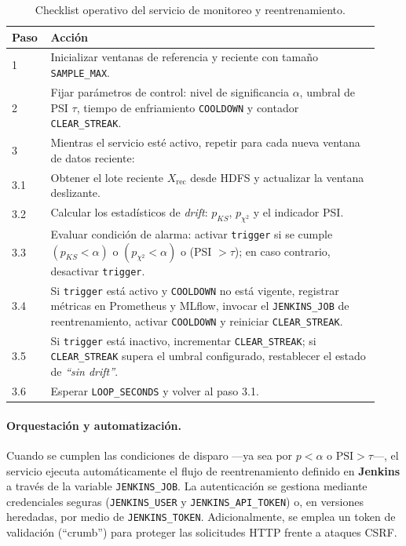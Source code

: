 \begin{table}[htbp]
\centering
\caption{Checklist operativo del servicio de monitoreo y reentrenamiento.}
\label{tab:checklist-driftwatch}
\small
\begin{tabular}{p{0.09\linewidth} p{0.84\linewidth}}
\toprule
\textbf{Paso} & \textbf{Acción} \\
\midrule
1 & Inicializar ventanas de referencia y reciente con tamaño \texttt{SAMPLE\_MAX}. \\[2pt]

2 & Fijar parámetros de control: nivel de significancia $\alpha$, umbral de PSI $\tau$, tiempo de enfriamiento \texttt{COOLDOWN} y contador \texttt{CLEAR\_STREAK}. \\[2pt]

3 & Mientras el servicio esté activo, repetir para cada nueva ventana de datos reciente: \\[2pt]

3.1 & Obtener el lote reciente $X_{\text{rec}}$ desde HDFS y actualizar la ventana deslizante. \\[2pt]

3.2 & Calcular los estadísticos de \textit{drift}: $p_{KS}$, $p_{\chi^2}$ y el indicador PSI. \\[2pt]

3.3 & Evaluar condición de alarma: activar \texttt{trigger} si se cumple
$(p_{KS} < \alpha)$ o $(p_{\chi^2} < \alpha)$ o (PSI $> \tau$); en caso contrario, desactivar \texttt{trigger}. \\[2pt]

3.4 & Si \texttt{trigger} está activo y \texttt{COOLDOWN} no está vigente, registrar métricas en Prometheus y MLflow, invocar el \texttt{JENKINS\_JOB} de reentrenamiento, activar \texttt{COOLDOWN} y reiniciar \texttt{CLEAR\_STREAK}. \\[2pt]

3.5 & Si \texttt{trigger} está inactivo, incrementar \texttt{CLEAR\_STREAK}; si \texttt{CLEAR\_STREAK} supera el umbral configurado, restablecer el estado de \emph{“sin drift”}. \\[2pt]

3.6 & Esperar \texttt{LOOP\_SECONDS} y volver al paso 3.1. \\
\bottomrule
\end{tabular}
\end{table}




\paragraph{Orquestación y automatización.}  
Cuando se cumplen las condiciones de disparo —ya sea por \(p < \alpha\) o \(\mathrm{PSI} > \tau\)—, el servicio ejecuta automáticamente el flujo de reentrenamiento definido en \textbf{Jenkins} a través de la variable \texttt{JENKINS\_JOB}.  
La autenticación se gestiona mediante credenciales seguras (\texttt{JENKINS\_USER} y \texttt{JENKINS\_API\_TOKEN}) o, en versiones heredadas, por medio de \texttt{JENKINS\_TOKEN}.  
Adicionalmente, se emplea un token de validación (“crumb”) para proteger las solicitudes HTTP frente a ataques CSRF.

